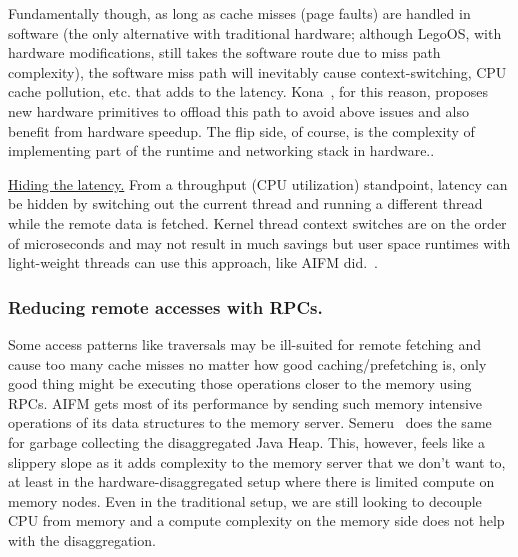 Fundamentally though, as long as cache misses (page faults) are 
handled in software (the only alternative with traditional hardware; 
although LegoOS, with hardware modifications, still takes the
software route due to miss path complexity), the software miss path 
will inevitably cause context-switching, CPU cache pollution,
etc. that adds to the latency. 
Kona~\cite{kona}, for this reason, proposes new hardware 
primitives to offload this path to avoid above issues 
and also benefit from hardware speedup. 
The flip side, of course, is the
complexity of implementing part of the runtime and networking 
stack in hardware.. 

\vspace{3pt}
\noindent \uline{Hiding the latency.}
From a throughput (CPU utilization) standpoint, latency 
can be hidden by switching out the current thread and 
running a different thread while the remote data is fetched.
Kernel thread context switches are on the order of 
microseconds and may not result in much savings 
but user space runtimes with light-weight 
threads can use this approach, like AIFM did.~\cite{aifm}.


\subsubsection{Reducing remote accesses with RPCs.}
Some access patterns like traversals may be ill-suited for remote 
fetching and cause too many cache misses no matter how good 
caching/prefetching is, only good thing might be executing those 
operations closer to the memory using RPCs. 
AIFM gets most of its performance
by sending such memory intensive operations of its data structures to 
the memory server. Semeru~\cite{semeru} does the same for 
garbage collecting the disaggregated Java Heap. This, however,
feels like a slippery slope as it adds complexity to the memory 
server that we don't want to, at least in the hardware-disaggregated 
setup where there is limited compute on memory nodes. 
Even in the traditional setup, we are still looking to decouple 
CPU from memory and a compute complexity on the memory side does 
not help with the disaggregation. 


